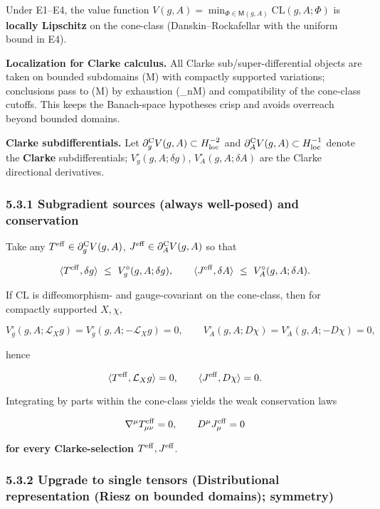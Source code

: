 \documentclass[
]{article}
\numberwithin{equation}{section}
\begin{document}
Under E1--E4, the value function
\(V(g,A)=\min_{\Phi\in\mathsf M(g,A)}\mathrm{CL}(g,A;\Phi)\) is
\textbf{locally Lipschitz} on the cone-class (Danskin--Rockafellar with
the uniform bound in E4).

\textbf{Localization for Clarke calculus.} All Clarke
sub/super-differential objects are taken on bounded subdomains
(\Omega\Subset M) with compactly supported variations; conclusions pass
to (M) by exhaustion (\Omega\_n\uparrow M) and compatibility of the
cone-class cutoffs. This keeps the Banach-space hypotheses crisp and
avoids overreach beyond bounded domains.

\textbf{Clarke subdifferentials.} Let
\(\partial_g^{\mathrm C} V(g,A)\subset H^{-2}_{\rm loc}\) and
\(\partial_A^{\mathrm C} V(g,A)\subset H^{-1}_{\rm loc}\) denote the
\textbf{Clarke} subdifferentials; \(V_g^\circ(g,A;\delta g)\),
\(V_A^\circ(g,A;\delta A)\) are the Clarke directional derivatives.

\hypertarget{subgradient-sources-always-well-posed-and-conservation}{%
\subsubsection{5.3.1 Subgradient sources (always well-posed) and
conservation}\label{subgradient-sources-always-well-posed-and-conservation}}

Take any \(T^{\rm eff}\in\partial_g^{\mathrm C}V(g,A)\),
\(J^{\rm eff}\in\partial_A^{\mathrm C}V(g,A)\) so that

\[
\langle T^{\rm eff},\delta g\rangle\ \le\ V_g^\circ(g,A;\delta g),\qquad
\langle J^{\rm eff},\delta A\rangle\ \le\ V_A^\circ(g,A;\delta A).
\]

If \(\mathrm{CL}\) is diffeomorphism- and gauge-covariant on the
cone-class, then for compactly supported \(X,\chi\),

\[
V_g^\circ(g,A;\mathcal L_X g)=V_g^\circ(g,A;-\mathcal L_X g)=0,\qquad
V_A^\circ(g,A;D\chi)=V_A^\circ(g,A;-D\chi)=0,
\]

hence

\[
\langle T^{\rm eff},\mathcal L_X g\rangle=0,\qquad \langle J^{\rm eff},D\chi\rangle=0.
\]

Integrating by parts within the cone-class yields the weak conservation
laws

\[
\nabla^\mu T^{\rm eff}_{\mu\nu}=0,\qquad D^\mu J^{\rm eff}_\mu=0
\]

\textbf{for every Clarke-selection} \(T^{\rm eff},J^{\rm eff}\).

\hypertarget{upgrade-to-single-tensors-distributional-representation-riesz-on-bounded-domains-symmetry}{%
\subsubsection{5.3.2 Upgrade to single tensors (Distributional
representation (Riesz on bounded domains);
symmetry)}\label{upgrade-to-single-tensors-distributional-representation-riesz-on-bounded-domains-symmetry}}
\end{document}
